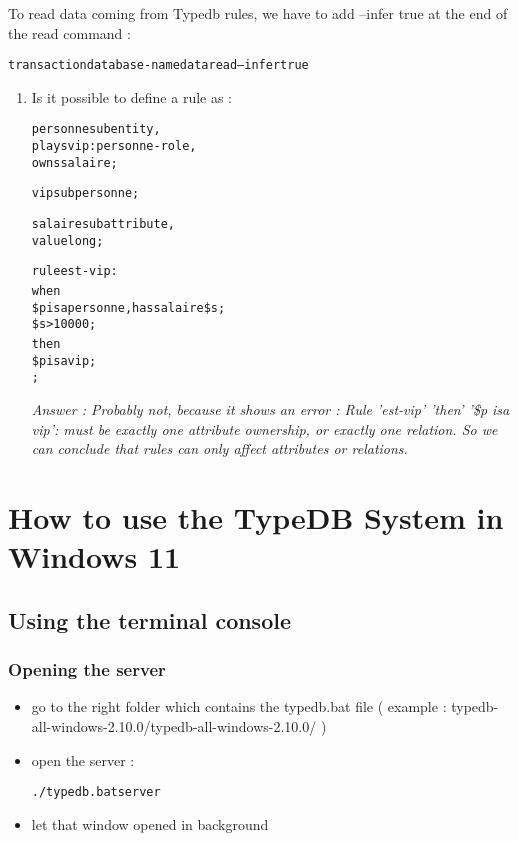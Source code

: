 \documentclass[runningheads]{llncs}
\begin{document}
To read data coming from Typedb rules, we have to add --infer true at the end of the read command : 
\begin{alltt}
transaction database-name data read --infer true
\end{alltt}


\begin{enumerate}
\item Is it possible to define a rule as :
\begin{alltt}
personne sub entity,
    plays vip:personne-role,
    owns salaire;
    
vip sub personne;

salaire sub attribute,
  value long;

rule est-vip:
when {
  \$p isa personne, has salaire \$s;
  \$s > 10000;
} then {
 \$p isa vip;
};
\end{alltt}

\emph{Answer : Probably not, because it shows an error : Rule 'est-vip' 'then' '\$p isa vip': must be exactly one attribute ownership, or exactly one relation.
So we can conclude that rules can only affect attributes or relations. }


\end{enumerate}


\section{How to use the TypeDB System in Windows 11}

\subsection{Using the terminal console}


\subsubsection{Opening the server}

\begin{itemize}
\item go to the right folder which contains the typedb.bat file ( example : typedb-all-windows-2.10.0/typedb-all-windows-2.10.0/ )
\item open the server : \begin{alltt}./typedb.bat server \end{alltt}
\item let that window opened in background
\end{itemize}
\end{document}
